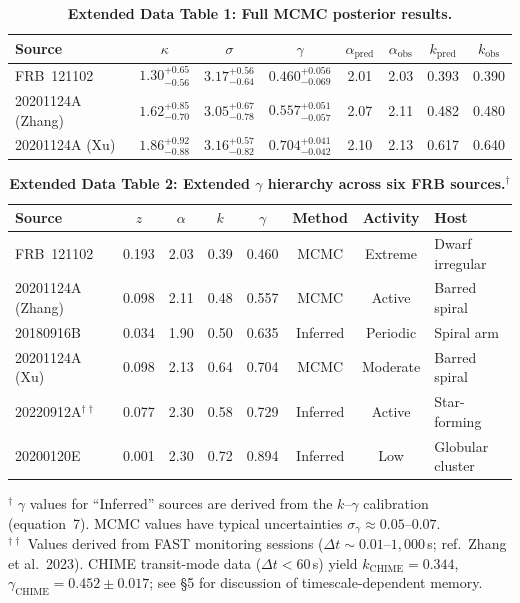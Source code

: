 \documentclass[twocolumn]{article}
\begin{document}

\begin{table}[!ht]
\centering
\caption{\textbf{Extended Data Table 1: Full MCMC posterior results.}}
\begin{tabular}{lccccccc}
\toprule
\textbf{Source} & $\kappa$ & $\sigma$ & $\gamma$ & $\alpha_{\mathrm{pred}}$ & $\alpha_{\mathrm{obs}}$ & $k_{\mathrm{pred}}$ & $k_{\mathrm{obs}}$ \\
\midrule
FRB~121102            & $1.30^{+0.65}_{-0.56}$ & $3.17^{+0.56}_{-0.64}$ & $0.460^{+0.056}_{-0.069}$ & 2.01 & 2.03 & 0.393 & 0.390 \\
20201124A (Zhang)     & $1.62^{+0.85}_{-0.70}$ & $3.05^{+0.67}_{-0.78}$ & $0.557^{+0.051}_{-0.057}$ & 2.07 & 2.11 & 0.482 & 0.480 \\
20201124A (Xu)        & $1.86^{+0.92}_{-0.88}$ & $3.16^{+0.57}_{-0.82}$ & $0.704^{+0.041}_{-0.042}$ & 2.10 & 2.13 & 0.617 & 0.640 \\
\bottomrule
\end{tabular}
\label{tab:ed1}
\end{table}

\begin{table}[!ht]
\centering
\caption{\textbf{Extended Data Table 2: Extended $\gamma$ hierarchy across six FRB sources.}$^{\dagger}$}
\begin{tabular}{lccccccl}
\toprule
\textbf{Source} & $z$ & $\alpha$ & $k$ & $\gamma$ & Method & Activity & Host \\
\midrule
FRB~121102         & 0.193 & 2.03 & 0.39 & 0.460 & MCMC     & Extreme    & Dwarf irregular \\
20201124A (Zhang)  & 0.098 & 2.11 & 0.48 & 0.557 & MCMC     & Active     & Barred spiral \\
20180916B          & 0.034 & 1.90 & 0.50 & 0.635 & Inferred & Periodic   & Spiral arm \\
20201124A (Xu)     & 0.098 & 2.13 & 0.64 & 0.704 & MCMC     & Moderate   & Barred spiral \\
20220912A$^{\dagger\dagger}$  & 0.077 & 2.30 & 0.58 & 0.729 & Inferred & Active     & Star-forming \\
20200120E          & 0.001 & 2.30 & 0.72 & 0.894 & Inferred & Low        & Globular cluster \\
\bottomrule
\end{tabular}
\begin{flushleft}
{\footnotesize $^{\dagger}$ $\gamma$ values for ``Inferred'' sources are derived from the $k$--$\gamma$ calibration (equation~7). MCMC values have typical uncertainties $\sigma_\gamma \approx 0.05$--$0.07$.}\\
{\footnotesize $^{\dagger\dagger}$ Values derived from FAST monitoring sessions ($\Delta t \sim 0.01$--$1{,}000$\,s; ref.~Zhang et al.~2023). CHIME transit-mode data ($\Delta t < 60$\,s) yield $k_{\mathrm{CHIME}} = 0.344$, $\gamma_{\mathrm{CHIME}} = 0.452 \pm 0.017$; see \S5 for discussion of timescale-dependent memory.}
\end{flushleft}
\label{tab:ed2}
\end{table}
\end{document}
